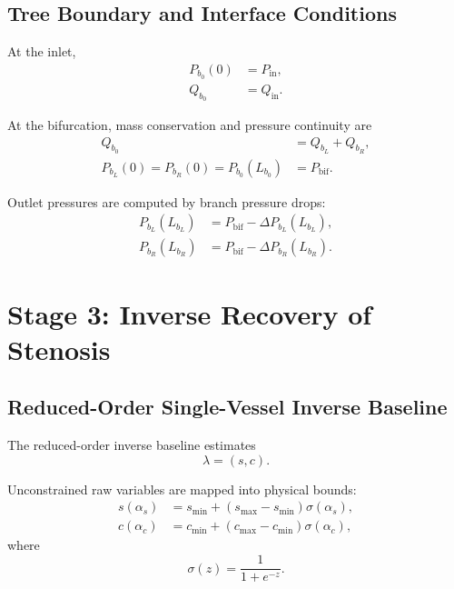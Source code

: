 \documentclass[11pt]{article}
\begin{document}
\subsection{Tree Boundary and Interface Conditions}

At the inlet,
\begin{align}
    P_{b_0}(0) &= P_{\mathrm{in}},\\
    Q_{b_0} &= Q_{\mathrm{in}}.
\end{align}

At the bifurcation, mass conservation and pressure continuity are
\begin{align}
    Q_{b_0} &= Q_{b_L}+Q_{b_R},\\
    P_{b_L}(0)
    =
    P_{b_R}(0)
    =
    P_{b_0}(L_{b_0})
    &=
    P_{\mathrm{bif}}.
\end{align}

Outlet pressures are computed by branch pressure drops:
\begin{align}
    P_{b_L}(L_{b_L})
    &=
    P_{\mathrm{bif}}
    -
    \Delta P_{b_L}(L_{b_L}),
    \\
    P_{b_R}(L_{b_R})
    &=
    P_{\mathrm{bif}}
    -
    \Delta P_{b_R}(L_{b_R}).
\end{align}

\section{Stage 3: Inverse Recovery of Stenosis}

\subsection{Reduced-Order Single-Vessel Inverse Baseline}

The reduced-order inverse baseline estimates
\begin{equation}
    \lambda=(s,c).
\end{equation}

Unconstrained raw variables are mapped into physical bounds:
\begin{align}
    s(\alpha_s)
    &=
    s_{\min}
    +
    (s_{\max}-s_{\min})\sigma(\alpha_s),\\
    c(\alpha_c)
    &=
    c_{\min}
    +
    (c_{\max}-c_{\min})\sigma(\alpha_c),
\end{align}
where
\begin{equation}
    \sigma(z)=\frac{1}{1+e^{-z}}.
\end{equation}
\end{document}
